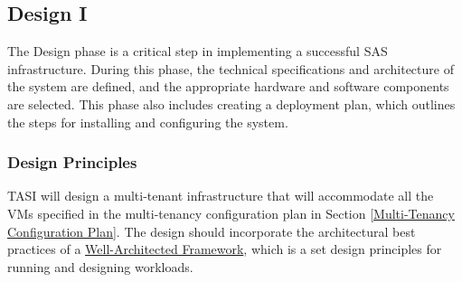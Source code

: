 
\subsection{Design I}

The Design phase is a critical step in implementing a successful SAS infrastructure. During this phase, the technical specifications and architecture of the system are defined, and the appropriate hardware and software components are selected. This phase also includes creating a deployment plan, which outlines the steps for installing and configuring the system.

\subsubsection{Design Principles}

TASI will design a multi-tenant infrastructure that will accommodate all the VMs specified in the multi-tenancy configuration plan in Section \ref{Multi-Tenancy Configuration Plan}. The design should incorporate the architectural best practices of a \href{https://learn.microsoft.com/en-us/azure/well-architected/}{Well-Architected Framework}, which is a set design principles for running and designing workloads.

